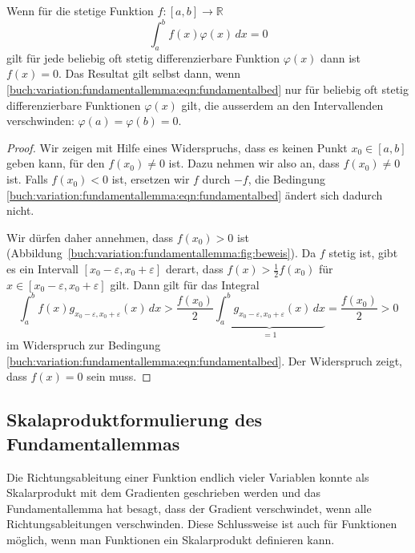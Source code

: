 \begin{satz}[Fundamentallemma]
\label{buch:variation:fundamentallemma:satz:fundamentallemma}
Wenn für die stetige Funktion $f\colon[a,b]\to\mathbb{R}$ 
\begin{equation}
\int_a^b f(x)\varphi(x)\,dx = 0
\label{buch:variation:fundamentallemma:eqn:fundamentalbed}
\end{equation}
gilt für jede beliebig oft stetig differenzierbare Funktion $\varphi(x)$ 
dann ist $f(x)=0$.
Das Resultat gilt selbst dann, wenn
\eqref{buch:variation:fundamentallemma:eqn:fundamentalbed}
nur für beliebig oft stetig differenzierbare Funktionen $\varphi(x)$ 
gilt, die ausserdem an den Intervallenden verschwinden:
$\varphi(a)=\varphi(b)=0$.
\end{satz}

\begin{proof}
Wir zeigen mit Hilfe eines Widerspruchs, dass es keinen Punkt $x_0\in[a,b]$
geben kann, für den $f(x_0)\ne 0$ ist.
Dazu nehmen wir also an, dass $f(x_0)\ne 0$ ist.
Falls $f(x_0)<0$ ist, ersetzen wir $f$ durch $-f$, 
die Bedingung
\eqref{buch:variation:fundamentallemma:eqn:fundamentalbed}
ändert sich dadurch nicht.

Wir dürfen daher annehmen, dass $f(x_0)>0$ ist
(Abbildung~\ref{buch:variation:fundamentallemma:fig:beweis}).
Da $f$ stetig ist, gibt es ein Intervall $[x_0-\varepsilon,x_0+\varepsilon]$
derart, dass $f(x)> \frac12 f(x_0)$ für
$x\in[x_0-\varepsilon,x_0+\varepsilon]$ gilt.
Dann gilt für das Integral
\[
\int_a^b
f(x)
g_{x_0-\varepsilon,x_0+\varepsilon} (x)
\,dx
>
\frac{f(x_0)}{2}
\underbrace{
\int_a^b
g_{x_0-\varepsilon,x_0+\varepsilon} (x)
\,dx
}_{\displaystyle =1}
=
\frac{f(x_0)}{2}
>
0
\]
im Widerspruch zur Bedingung
\eqref{buch:variation:fundamentallemma:eqn:fundamentalbed}.
Der Widerspruch zeigt, dass $f(x)=0$ sein muss.
\end{proof}

%
%
\subsection{Skalaproduktformulierung des Fundamentallemmas}
Die Richtungsableitung einer Funktion endlich vieler Variablen 
konnte als Skalarprodukt mit dem Gradienten geschrieben werden und
das Fundamentallemma hat besagt, dass der Gradient verschwindet,
wenn alle Richtungsableitungen verschwinden.
Diese Schlussweise ist auch für Funktionen möglich, wenn man Funktionen
ein Skalarprodukt definieren kann.

